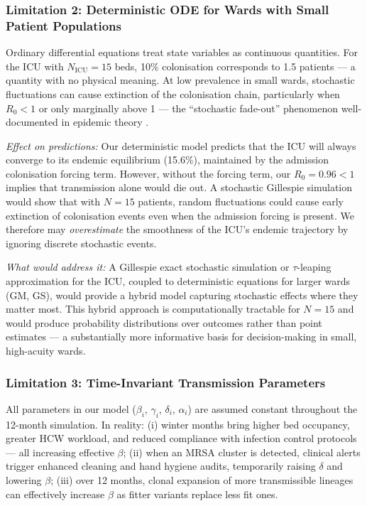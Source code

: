 \documentclass[12pt,a4paper]{article}
\begin{document}
\subsubsection{Limitation 2: Deterministic ODE for Wards with Small Patient Populations}

Ordinary differential equations treat state variables as continuous quantities. For the ICU with $N_{\text{ICU}} = 15$ beds, 10\% colonisation corresponds to 1.5 patients --- a quantity with no physical meaning. At low prevalence in small wards, stochastic fluctuations can cause extinction of the colonisation chain, particularly when $R_0 < 1$ or only marginally above 1 --- the ``stochastic fade-out'' phenomenon well-documented in epidemic theory \cite{diekmann1990}.

\textit{Effect on predictions:} Our deterministic model predicts that the ICU will always converge to its endemic equilibrium (15.6\%), maintained by the admission colonisation forcing term. However, without the forcing term, our $R_0 = 0.96 < 1$ implies that transmission alone would die out. A stochastic Gillespie simulation would show that with $N = 15$ patients, random fluctuations could cause early extinction of colonisation events even when the admission forcing is present. We therefore may \textit{overestimate} the smoothness of the ICU's endemic trajectory by ignoring discrete stochastic events.

\textit{What would address it:} A Gillespie exact stochastic simulation or $\tau$-leaping approximation for the ICU, coupled to deterministic equations for larger wards (GM, GS), would provide a hybrid model capturing stochastic effects where they matter most. This hybrid approach is computationally tractable for $N = 15$ and would produce probability distributions over outcomes rather than point estimates --- a substantially more informative basis for decision-making in small, high-acuity wards.

\subsubsection{Limitation 3: Time-Invariant Transmission Parameters}

All parameters in our model ($\beta_i$, $\gamma_i$, $\delta_i$, $\alpha_i$) are assumed constant throughout the 12-month simulation. In reality: (i) winter months bring higher bed occupancy, greater HCW workload, and reduced compliance with infection control protocols --- all increasing effective $\beta$; (ii) when an MRSA cluster is detected, clinical alerts trigger enhanced cleaning and hand hygiene audits, temporarily raising $\delta$ and lowering $\beta$; (iii) over 12 months, clonal expansion of more transmissible lineages can effectively increase $\beta$ as fitter variants replace less fit ones.
\end{document}
